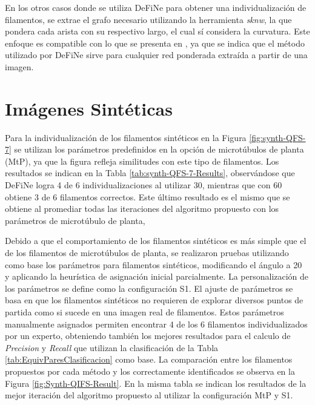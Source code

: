 En los otros casos donde se utiliza DeFiNe para obtener una individualizaci\'on de filamentos, se extrae el grafo necesario utilizando la herramienta {\it sknw}, la que pondera cada arista con su respectivo largo, el cual s\'i considera la curvatura. Este enfoque es compatible con lo que se presenta en \citet{breuer2015define}, ya que se indica que el m\'etodo utilizado por DeFiNe sirve para cualquier red ponderada extra\'ida a partir de una imagen.


\section{Im\'agenes Sint\'eticas}

Para la individualizaci\'on de los filamentos sint\'eticos en la Figura \ref{fig:synth-QFS-7} se utilizan los par\'ametros predefinidos en la opci\'on de microt\'ubulos de planta (MtP), ya que la figura refleja similitudes con este tipo de filamentos.
Los resultados se indican en la Tabla \ref{tab:synth-QFS-7-Results}, observ\'andose que DeFiNe logra 4 de 6 individualizaciones al utilizar 30\textdegree, mientras que con 60\textdegree~ obtiene 3 de 6 filamentos correctos. Este \'ultimo resultado es el mismo que se obtiene al promediar todas las iteraciones del algoritmo propuesto con los par\'ametros de microt\'ubulo de planta,

Debido a que el comportamiento de los filamentos sint\'eticos es m\'as simple que el de los filamentos de microt\'ubulos de planta, se realizaron pruebas utilizando como base los par\'ametros para filamentos sint\'eticos, modificando el \'angulo a 20\textdegree~ y aplicando la heur\'istica de asignaci\'on inicial parcialmente. La personalizaci\'on de los par\'ametros se define como la configuraci\'on S1. El ajuste de par\'ametros se basa en que los filamentos sint\'eticos no requieren de explorar diversos puntos de partida como si sucede en una imagen real de filamentos. Estos par\'ametros manualmente asignados permiten encontrar 4 de los 6 filamentos individualizados por un experto, obteniendo tambi\'en los mejores resultados para el calculo de {\it Precision} y {\it Recall} que utilizan la clasificaci\'on de la Tabla \ref{tab:EquivParesClasificacion} como base. La comparaci\'on entre los filamentos propuestos por cada m\'etodo y los correctamente identificados se observa en la Figura \ref{fig:Synth-QIFS-Result}. En la misma tabla se indican los resultados de la mejor iteraci\'on del algoritmo propuesto al utilizar la configuraci\'on MtP y S1.


